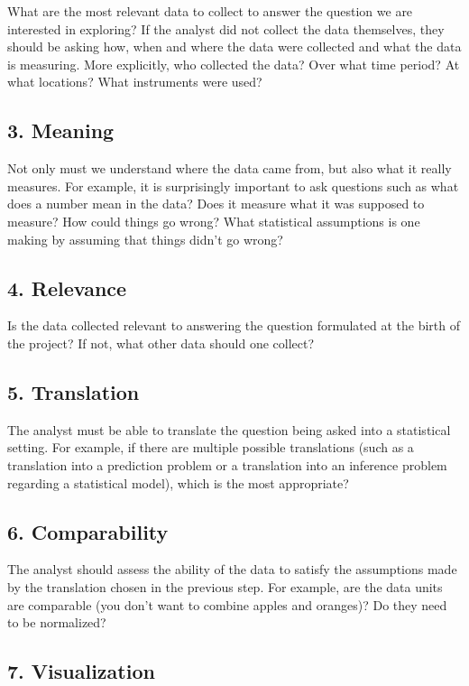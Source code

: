 What are the most relevant data to collect to answer the question we are interested in exploring? If the analyst did not collect the data themselves, they should be asking how, when and where the data were collected and what the data is measuring. More explicitly, who collected the data? Over what time period? At what locations? What instruments were used?

\subsection*{3. Meaning}

Not only must we understand where the data came from, but also what it really measures. For example, it is surprisingly important to ask questions such as what does a number mean in the data? Does it measure what it was supposed to measure? How could things go wrong? What statistical assumptions is one making by assuming that things didn't go wrong?

\subsection*{4. Relevance}

Is the data collected relevant to answering the question formulated at the birth of the project? If not, what other data should one collect?

\subsection*{5. Translation}

The analyst must be able to translate the question being asked into a statistical setting. For example, if there are multiple possible translations (such as a translation into a prediction problem or a translation into an inference problem regarding a statistical model), which is the most appropriate? 

\subsection*{6. Comparability}

The analyst should assess the ability of the data to satisfy the assumptions made by the translation chosen in the previous step. For example, are the data units are comparable (you don't want to combine apples and oranges)? Do they need to be normalized? 

\subsection*{7. Visualization}

